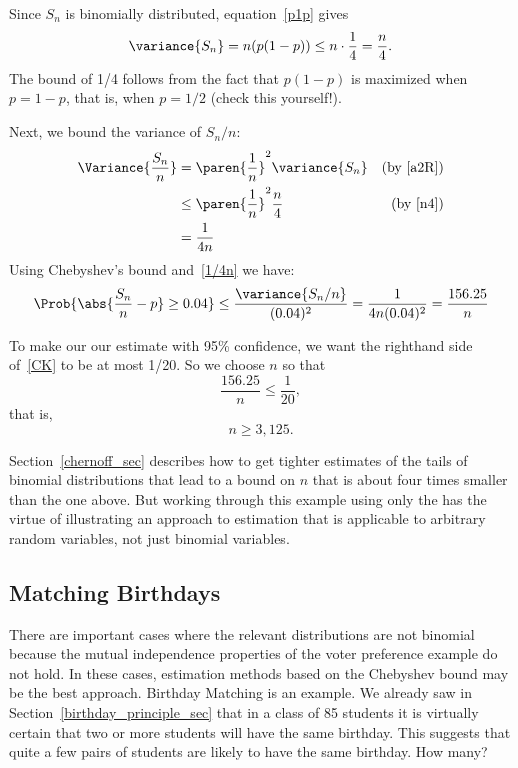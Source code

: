 Since $S_n$ is binomially distributed, equation~\eqref{p1p} gives
\[
\variance{S_n}  = n(p(1-p)) \leq n \cdot \frac{1}{4} = \frac{n}{4}.\label{n4}
\]
The bound of 1/4 follows from the fact that $p(1-p)$ is maximized when $p
= 1-p$, that is, when $p=1/2$ (check this yourself!).

Next, we bound the variance of $S_n/n$:
\begin{align}
\Variance{\frac{S_n}{n}}
       & = \paren{\frac{1}{n}}^2 \variance{S_n}
                     & \text{(by~\eqref{a2R})}\notag\\
       & \leq \paren{\frac{1}{n}}^2 \frac{n}{4} & \text{(by~\eqref{n4})}\notag\\
       & = \frac{1}{4n}\label{1/4n}
\end{align}
Using Chebyshev's bound and~\eqref{1/4n} we have:
\begin{equation}\label{CK}
\Prob{\abs{\frac{S_n}{n} - p} \geq 0.04}
    \leq \frac{\variance{S_n/n}}{(0.04)^2}
       = \frac{1}{4n(0.04)^2} = \frac{156.25}{n}
\end{equation}

To make our our estimate with 95\% confidence, we want the righthand
side of~\eqref{CK} to be at most 1/20.  So we choose $n$ so that
\[
\frac{156.25}{n} \leq \frac{1}{20},
\]
that is,
\[
n \geq 3,125.
\]

Section~\ref{chernoff_sec} describes how to get tighter estimates of
the tails of binomial distributions that lead to a bound on $n$ that
is about four times smaller than the one above.  But working through
this example using only the  has the virtue of
illustrating an approach to estimation that is applicable to arbitrary
random variables, not just binomial variables.
\iffalse , and it did lead to a feasible, though larger than
necessary, sample size.\fi

\subsection{Matching Birthdays}\label{bday_deviation_subsec}

There are important cases where the relevant distributions are not
binomial because the mutual independence properties of the voter
preference example do not hold.  In these cases, estimation methods
based on the Chebyshev bound may be the best approach.  Birthday
Matching is an example.  We already saw in
Section~\ref{birthday_principle_sec} that in a class of 85 students it
is virtually certain that two or more students will have the same
birthday.  This suggests that quite a few pairs of students are likely
to have the same birthday.  How many?

